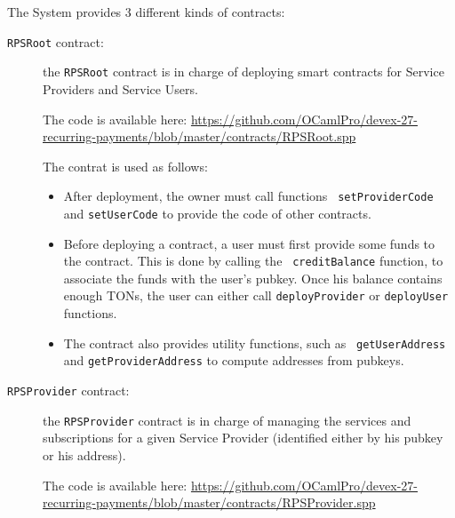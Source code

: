 \documentclass[10pt,a4paper]{article}
\begin{document}
The System provides 3 different kinds of contracts:
\begin{description}
\item[{\tt RPSRoot} contract:] the {\tt RPSRoot} contract is in charge
  of deploying smart contracts for Service Providers and Service
  Users.

  The code is available here: \url{https://github.com/OCamlPro/devex-27-recurring-payments/blob/master/contracts/RPSRoot.spp}

  The contrat is used as follows:
  \begin{itemize}
  \item After deployment, the owner must call functions {\tt
    setProviderCode} and {\tt setUserCode} to provide the code of
    other contracts.
  \item Before deploying a contract, a user must first provide some
    funds to the contract. This is done by calling the {\tt
      creditBalance} function, to associate the funds with the user's
    pubkey. Once his balance contains enough TONs, the user can either
    call {\tt deployProvider} or {\tt deployUser} functions.
  \item The contract also provides utility functions, such as {\tt
    getUserAddress} and {\tt getProviderAddress} to compute addresses
    from pubkeys.
  \end{itemize}
  
\item[{\tt RPSProvider} contract:] the {\tt RPSProvider} contract is
  in charge of managing the services and subscriptions for a given
  Service Provider (identified either by his pubkey or his address).

  The code is available here: \url{https://github.com/OCamlPro/devex-27-recurring-payments/blob/master/contracts/RPSProvider.spp}


\end{description}
\end{document}
